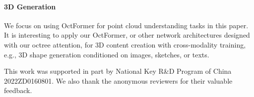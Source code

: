 \documentclass[acmtog,screen,authorversion]{acmart}
\begin{document}
\paragraph{3D Generation}
We focus on using OctFormer for point cloud understanding tasks in this paper.
It is interesting to apply our OctFormer, or other network architectures designed with our octree attention, for 3D content creation with cross-modality training, e.g., 3D shape generation conditioned on images, sketches, or texts.
 

\begin{acks}
This work was supported in part by National Key R\&D Program of China 2022ZD0160801.
We also thank the anonymous reviewers for their valuable feedback.
\end{acks}




\end{document}
